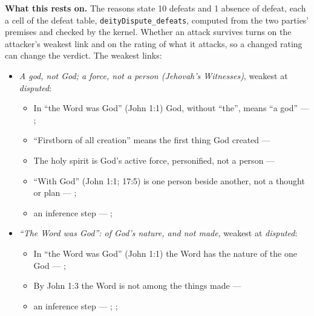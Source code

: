 \documentclass[11pt,paper=\testimonypaper,DIV=13,parskip=false]{scrartcl}
\begin{document}
\par\noindent\textbf{What this rests on.} The reasons state 10 defeats and 1 absence of defeat, each a cell of the defeat table, \texttt{deity\allowbreak{}Dispute\_\allowbreak{}defeats}, computed from the two parties' premises and checked by the kernel. Whether an attack survives turns on the attacker's weakest link and on the rating of what it attacks, so a changed rating can change the verdict. The weakest links:
\begin{itemize}
\item \emph{A god, not God; a force, not a person (Jehovah’s Witnesses)}, weakest at \emph{disputed}:
\begin{itemize}
\item In “the Word was God” (John 1:1) God, without “the”, means “a god” --- \cite[27]{watchtower-should-you-believe-trinity-1989}; \cite{new-world-translation-2013}
\item “Firstborn of all creation” means the first thing God created --- \cite[14]{watchtower-should-you-believe-trinity-1989}
\item The holy spirit is God’s active force, personified, not a person --- \cite[20--23]{watchtower-should-you-believe-trinity-1989}
\item “With God” (John 1:1; 17:5) is one person beside another, not a thought or plan --- \cite[3, The Triune God]{kibbey-living-systematic-theology-2026}; \cite[27]{watchtower-should-you-believe-trinity-1989}
\item an inference step --- \cite[23]{watchtower-should-you-believe-trinity-1989}; \cite[122--123]{roberts-christendom-astray}
\end{itemize}
\item \emph{“The Word was God”: of God’s nature, and not made}, weakest at \emph{disputed}:
\begin{itemize}
\item In “the Word was God” (John 1:1) the Word has the nature of the one God --- \cite{harner-qualitative-anarthrous-1973}; \cite[3, The Triune God]{kibbey-living-systematic-theology-2026}
\item By John 1:3 the Word is not among the things made --- \cite[Tractates on John I.11]{schaff-nicene-post-nicene-fathers-1-7}
\item an inference step --- \cite[3, The Triune God]{kibbey-living-systematic-theology-2026}; \cite[ch. 4, Conclusion]{bernard-oneness-of-god-1983}; \cite[17--19]{buzzard-caveat-lector-2001}
\end{itemize}

\end{itemize}
\end{document}
